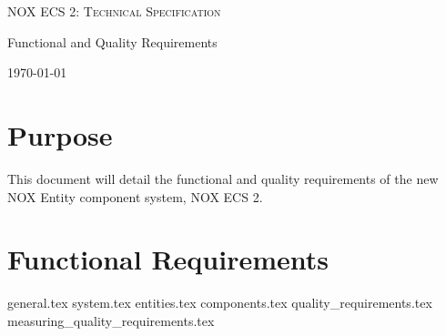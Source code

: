 \documentclass[hidelinks]{article}
\begin{document}

\begin{titlepage}
    \centering
    {\scshape\LARGE NOX ECS 2: Technical Specification \par}
    \vspace{2cm}
    {Functional and Quality Requirements \par}
    \vfill
    {\large \today\par}
\end{titlepage}

\pagebreak
\tableofcontents
\pagebreak

\section{Purpose}
This document will detail the functional and quality requirements of the new NOX Entity component system, NOX ECS 2.

\section{Functional Requirements}
{general.tex}
{system.tex}
{entities.tex}
{components.tex}
{quality_requirements.tex}
{measuring_quality_requirements.tex}
\end{document}

